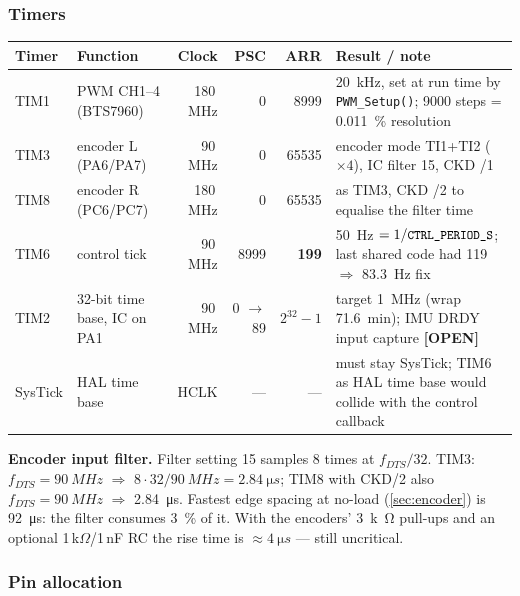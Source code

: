 \documentclass[11pt,a4paper]{article}
\newcommand{\mk}[2]{\textsf{\scriptsize\bfseries\colorbox{#1bg}{\color{#1}[#2]}}}
\newcommand{\OPEN}{\mk{grey}{OPEN}}
\newcommand{\tb}[1]{{\small\textcolor{bad}{\textsf{#1}}}}
\newcommand{\code}[1]{\texttt{\small #1}}
\begin{document}
\subsubsection{Timers}\label{sec:timers}

\begin{center}
\small
\begin{tabularx}{\textwidth}{@{}llrrrL@{}}
\toprule
\textbf{Timer} & \textbf{Function} & \textbf{Clock} & \textbf{PSC} & \textbf{ARR} & \textbf{Result / note}\\
\midrule
TIM1 & PWM CH1--4 (BTS7960) & 180\,MHz & 0 & 8999 & \qty{20}{kHz}, set at run time by \code{PWM\_Setup()}; 9000 steps = \qty{0.011}{\percent} resolution\\
TIM3 & encoder L (PA6/PA7) & 90\,MHz & 0 & 65535 & encoder mode TI1+TI2 ($\times4$), IC filter 15, CKD /1\\
TIM8 & encoder R (PC6/PC7) & 180\,MHz & 0 & 65535 & as TIM3, CKD /2 to equalise the filter time\\
TIM6 & control tick & 90\,MHz & 8999 & \textbf{199} & \qty{50}{Hz} $=1/\code{CTRL\_PERIOD\_S}$; last shared code had 119 $\Rightarrow$ \qty{83.3}{Hz} \tb{fix}\\
TIM2 & 32-bit time base, IC on PA1 & 90\,MHz & 0 $\to$ 89 & $2^{32}-1$ & target \qty{1}{MHz} (wrap \qty{71.6}{min}); IMU DRDY input capture \OPEN\\
SysTick & HAL time base & HCLK & --- & --- & must stay SysTick; TIM6 as HAL time base would collide with the control callback\\
\bottomrule
\end{tabularx}
\end{center}

\textbf{Encoder input filter.} Filter setting 15 samples 8 times at
$f_{DTS}/32$. TIM3: $f_{DTS}=\qty{90}{MHz}$ $\Rightarrow$
$8\cdot32/\qty{90}{MHz}=\qty{2.84}{\micro s}$; TIM8 with CKD/2 also
$f_{DTS}=\qty{90}{MHz}$ $\Rightarrow$ \qty{2.84}{\micro s}. Fastest edge spacing at
no-load (\cref{sec:encoder}) is \qty{92}{\micro s}: the filter consumes
\qty{3}{\percent} of it. With the encoders' \qty{3}{k\ohm} pull-ups and an
optional 1\,k$\Omega$/1\,nF RC the rise time is $\approx\qty{4}{\micro s}$ ---
still uncritical.

\subsubsection{Pin allocation}\label{sec:pins}
\end{document}
